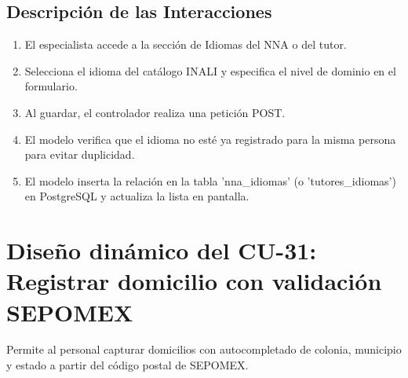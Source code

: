 \subsection{Descripción de las Interacciones}
\begin{enumerate}
    \item El especialista accede a la sección de Idiomas del NNA o del tutor.
    \item Selecciona el idioma del catálogo INALI y especifica el nivel de dominio en el formulario.
    \item Al guardar, el controlador realiza una petición POST.
    \item El modelo verifica que el idioma no esté ya registrado para la misma persona para evitar duplicidad.
    \item El modelo inserta la relación en la tabla 'nna\_idiomas' (o 'tutores\_idiomas') en PostgreSQL y actualiza la lista en pantalla.
\end{enumerate}

\cleardoublepage
\section{Diseño dinámico del CU-31: Registrar domicilio con validación SEPOMEX}
\label{sec:disenoDinamicoCU31}

Permite al personal capturar domicilios con autocompletado de colonia, municipio y estado a partir del código postal de SEPOMEX.

